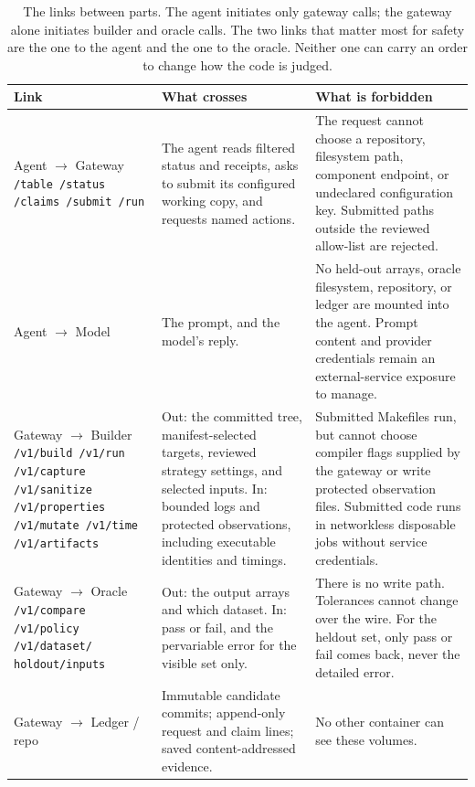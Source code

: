 \documentclass[11pt]{article}
\newcommand{\code}[1]{\texttt{#1}}
\begin{document}
\begin{table}[htbp]
\centering\small
\begin{tabular}{@{}p{}p{}p{}@{}}
\toprule
\textbf{Link} & \textbf{What crosses} & \textbf{What is forbidden} \\
\midrule
Agent $\to$ Gateway \code{/table /status /claims /submit /run} &
The agent reads filtered status and receipts, asks to submit its configured
working copy, and requests named actions. &
The request cannot choose a repository, filesystem path, component endpoint, or
undeclared configuration key. Submitted paths outside the reviewed allow-list
are rejected. \\
\addlinespace
Agent $\to$ Model &
The prompt, and the model's reply. &
No held-out arrays, oracle filesystem, repository, or ledger are mounted into
the agent. Prompt content and provider credentials remain an external-service
exposure to manage. \\
\addlinespace
Gateway $\to$ Builder \code{/v1/build /v1/run /v1/capture /v1/sanitize
/v1/properties /v1/mutate /v1/time /v1/artifacts} &
Out: the committed tree, manifest-selected targets, reviewed strategy settings,
and selected inputs. In: bounded logs and protected observations, including
executable identities and timings. &
Submitted Makefiles run, but cannot choose compiler flags supplied by the
gateway or write protected observation files. Submitted code runs in
networkless disposable jobs without service credentials. \\
\addlinespace
Gateway $\to$ Oracle \code{/v1/compare /v1/policy /v1/dataset/}
\code{holdout/inputs} &
Out: the output arrays and which dataset. In: pass or fail, and the per\-variable
error for the visible set only. &
There is no write path. Tolerances cannot change over the wire. For the held\-out
set, only pass or fail comes back, never the detailed error. \\
\addlinespace
Gateway $\to$ Ledger / repo &
Immutable candidate commits; append-only request and claim lines; saved
content-addressed evidence. &
No other container can see these volumes. \\
\bottomrule
\end{tabular}
\caption{The links between parts. The agent initiates only gateway calls; the
gateway alone initiates builder and oracle calls. The two
links that matter most for safety are the one to the agent and the one to the
oracle. Neither one can carry an order to change how the code is judged.}
\label{tab:edges}
\end{table}
\end{document}
